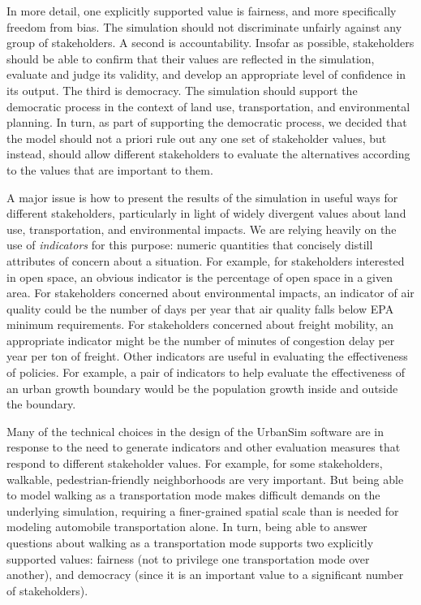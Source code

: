 \documentclass[times, 10pt,twocolumn]{article}
\begin{document}
In more detail, one explicitly supported value is fairness, and more
specifically freedom from bias.  The simulation should not discriminate
unfairly against any group of stakeholders.  A second is accountability.
Insofar as possible, stakeholders should be able to confirm that their
values are reflected in the simulation, evaluate and judge its validity,
and develop an appropriate level of confidence in its output.  The third is
democracy.  The simulation should support the democratic process in the
context of land use, transportation, and environmental planning.  In turn,
as part of supporting the democratic process, we decided that the model
should not a priori rule out any one set of stakeholder values, but
instead, should allow different stakeholders to evaluate the alternatives
according to the values that are important to them.

A major issue is how to present the results of the simulation in useful
ways for different stakeholders, particularly in light of widely divergent
values about land use, transportation, and environmental impacts.  We are
relying heavily on the use of \emph{indicators} for this purpose: numeric
quantities that concisely distill attributes of concern about a situation.
For example, for stakeholders interested in open space, an obvious
indicator is the percentage of open space in a given area.  For
stakeholders concerned about environmental impacts, an indicator of air
quality could be the number of days per year that air quality falls below
EPA minimum requirements.  For stakeholders concerned about freight
mobility, an appropriate indicator might be the number of minutes of
congestion delay per year per ton of freight.  Other indicators are useful
in evaluating the effectiveness of policies.  For example, a pair of
indicators to help evaluate the effectiveness of an urban growth boundary
would be the population growth inside and outside the boundary.

Many of the technical choices in the design of the UrbanSim software are in
response to the need to generate indicators and other evaluation measures
that respond to different stakeholder values.  For example, for some
stakeholders, walkable, pedestrian-friendly neighborhoods are very
important.  But being able to model walking as a transportation mode makes
difficult demands on the underlying simulation, requiring a finer-grained
spatial scale than is needed for modeling automobile transportation alone.
In turn, being able to answer questions about walking as a transportation
mode supports two explicitly supported values: fairness (not to privilege
one transportation mode over another), and democracy (since it is an 
important value to a significant number of stakeholders).
\end{document}
